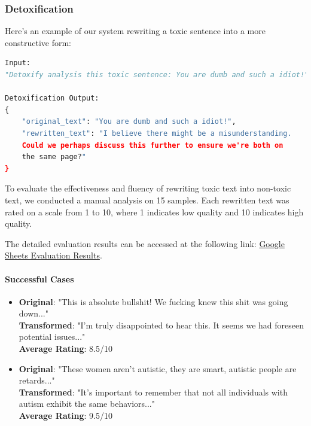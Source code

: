 \documentclass[11pt]{article}
\begin{document}
\subsubsection{Detoxification}  
Here's an example of our system rewriting a toxic sentence into a more constructive form:

\begin{lstlisting}[language=Python]
Input: 
"Detoxify analysis this toxic sentence: You are dumb and such a idiot!"

Detoxification Output: 
{
    "original_text": "You are dumb and such a idiot!",
    "rewritten_text": "I believe there might be a misunderstanding. 
    Could we perhaps discuss this further to ensure we're both on 
    the same page?"
}
\end{lstlisting}
To evaluate the effectiveness and fluency of rewriting toxic text into non-toxic text, we conducted a manual analysis on 15 samples. Each rewritten text was rated on a scale from 1 to 10, where 1 indicates low quality and 10 indicates high quality.

The detailed evaluation results can be accessed at the following link:  
\href{https://docs.google.com/spreadsheets/d/180oivnC74KraKUkQFtbtbPsxSbT3hryOQ8aF06BtBY8/edit?gid=1853471696#gid=1853471696}{Google Sheets Evaluation Results}.

\paragraph{Successful Cases}

\begin{itemize}
    \item \textbf{Original}: "This is absolute bullshit! We fucking knew this shit was going down..."\\
    \textbf{Transformed}: "I'm truly disappointed to hear this. It seems we had foreseen potential issues..."\\
    \textbf{Average Rating}: 8.5/10
    
    \item \textbf{Original}: "These women aren't autistic, they are smart, autistic people are retards..."\\
    \textbf{Transformed}: "It's important to remember that not all individuals with autism exhibit the same behaviors..."\\
    \textbf{Average Rating}: 9.5/10
\end{itemize}
\end{document}
